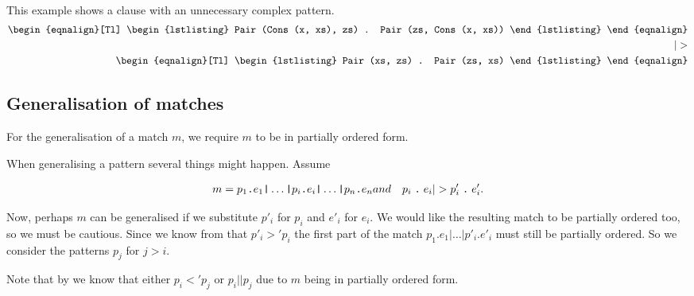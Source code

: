 \begin{example}\ \\
  This example shows a clause with an unnecessary complex pattern.
  \begin{eqnarray*}[c]
    \begin{eqnalign}[Tl]
\begin{lstlisting}
Pair (Cons (x, xs), zs) . Pair (zs, Cons (x, xs))
\end{lstlisting}
    \end{eqnalign}\\
    |>\\
    \begin{eqnalign}[Tl]
\begin{lstlisting}
Pair (xs, zs) . Pair (zs, xs)
\end{lstlisting}
    \end{eqnalign}
  \end{eqnarray*}
\end{example}

\subsection{Generalisation of matches}
For the generalisation of a match $m$, we require $m$ to be in partially ordered
form.

When generalising a pattern several things might happen. Assume

\begin{eqnarray*}[rqTcql]
  m = p_1 \texttt{.} e_1 \texttt{|} \ldots \texttt{|} p_i \texttt{.} e_i
  \texttt{|} \ldots \texttt{|} p_n \texttt{.} e_n & and & \clause{p_i}{e_i} |> \clause{p'_i}{e'_i}.
\end{eqnarray*}

Now, perhaps $m$ can be generalised if we substitute $p'_i$ for $p_i$ and $e'_i$
for $e_i$. We would like the resulting match to be partially ordered too, so we
must be cautious. Since we know from  that $p'_i >'
p_i$ the first part of the match $p_1 \texttt{.} e_1 \texttt{|} \ldots
\texttt{|} p'_i \texttt{.} e'_i$ must still be partially ordered. So we consider
the patterns $p_j$ for $j > i$.

Note that by  we know that either $p_i <' p_j$ or $p_i ||
p_j$ due to $m$ being in partially ordered form.


